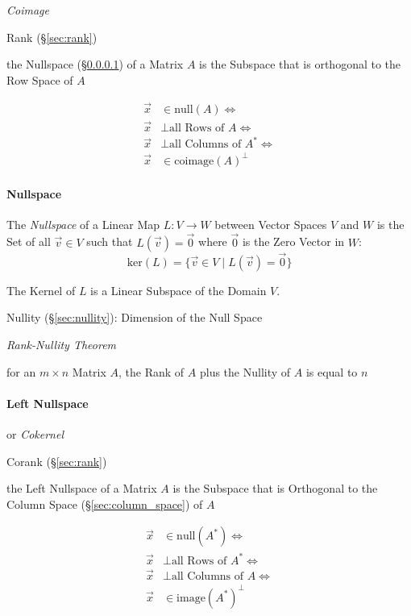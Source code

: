 \emph{Coimage}

Rank (\S\ref{sec:rank})

the Nullspace (\S\ref{sec:nullspace}) of a Matrix $A$ is the Subspace that is
orthogonal to the Row Space of $A$

\begin{align*}
  \vec{x} & \in \mathrm{null}(A) \Leftrightarrow         \\
  \vec{x} & \bot \text{all Rows of }A \Leftrightarrow    \\
  \vec{x} & \bot \text{all Columns of }A^* \Leftrightarrow   \\
  \vec{x} & \in \mathrm{coimage}(A)^\bot
\end{align*}



\paragraph{Nullspace}\label{sec:nullspace}\hfill

The \emph{Nullspace} of a Linear Map $L : V \rightarrow W$ between Vector
Spaces $V$ and $W$ is the Set of all $\vec{v}\in{V}$ such that $L(\vec{v}) =
\vec{0}$ where $\vec{0}$ is the Zero Vector in $W$:
\[
  \text{ker}(L) = \{\vec{v}\in{V} \;|\; L(\vec{v}) = \vec{0}\}
\]

The Kernel of $L$ is a Linear Subspace of the Domain $V$.

Nullity (\S\ref{sec:nullity}): Dimension of the Null Space

\emph{Rank-Nullity Theorem}

for an $m \times n$ Matrix $A$, the Rank of $A$ plus the Nullity
of $A$ is equal to $n$



\paragraph{Left Nullspace}\label{sec:left_nullspace}\hfill

or \emph{Cokernel}

Corank (\S\ref{sec:rank})

the Left Nullspace of a Matrix $A$ is the Subspace that is Orthogonal to the
Column Space (\S\ref{sec:column_space}) of $A$

\begin{align*}
  \vec{x} & \in \mathrm{null}(A^*) \Leftrightarrow         \\
  \vec{x} & \bot \text{all Rows of }A^* \Leftrightarrow    \\
  \vec{x} & \bot \text{all Columns of }A \Leftrightarrow   \\
  \vec{x} & \in \mathrm{image}(A^*)^\bot
\end{align*}



